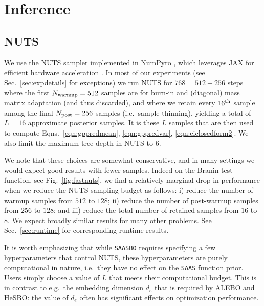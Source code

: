 \documentclass[accepted]{uai2021} %
\newcommand{\algoname}{{\texttt {SAASBO}}}
\newcommand{\priorname}{{\texttt {SAAS}}}
\begin{document}


\appendix

\section{Inference}


\subsection{NUTS}
\label{sec:suppnuts}
We use the NUTS sampler implemented in NumPyro \citep{phan2019composable, bingham2019pyro},
which leverages JAX for efficient hardware acceleration \citep{bradbury2020jax}.
In most of our experiments (see Sec.~\ref{sec:expdetails} for exceptions)
we run NUTS for $768 = 512 + 256$ steps
where the first $N_{\rm warmup} = 512$ samples are for burn-in and (diagonal) mass matrix adaptation (and thus discarded),
and where we retain every $16^{\rm th}$ sample among the final
$N_{\rm post}=256$ samples (i.e.~sample thinning),
yielding a total of $L=16$ approximate posterior samples.
It is these $L$ samples that are then used to compute Eqns.~\eqref{eqn:gppredmean}, \eqref{eqn:gppredvar}, \eqref{eqn:eiclosedform2}. We also limit the maximum tree depth in NUTS to $6$.

We note that these choices are somewhat conservative, and in many settings we would expect good results with fewer samples. Indeed on the Branin test function, see Fig.~\ref{fig:fastnuts},
we find a relatively marginal drop in performance
when we reduce the NUTS sampling budget as follows:
i) reduce the number of warmup samples from $512$ to $128$;
ii) reduce the number of post-warmup samples from $256$ to $128$; and
iii) reduce the total number of retained samples from $16$ to $8$. We expect broadly
similar results for many other problems. See Sec.~\ref{sec:runtime} for corresponding runtime results.

It is worth emphasizing that while \algoname{} requires specifying a few hyperparameters
that control NUTS, these hyperparameters are purely computational in nature, i.e.~they
have no effect on the \priorname{} function prior.
Users simply choose a value of $L$ that meets their computational budget.
This is in contrast to e.g.~the embedding dimension $d_e$ that is required by ALEBO and
HeSBO: the value of $d_e$ often has significant effects on optimization performance.
\end{document}
